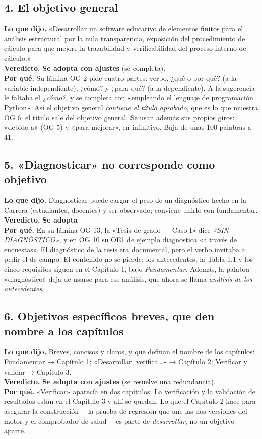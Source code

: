 \documentclass[11pt,a4paper]{article}
\newcommand{\adopta}{\textcolor{adopta}{\textbf{Se adopta}}}
\newcommand{\adapta}{\textcolor{adapta}{\textbf{Se adopta con ajustes}}}
\begin{document}
\subsection*{4. El objetivo general}
\textbf{Lo que dijo.} «Desarrollar un software educativo de elementos finitos para el análisis estructural por la nula transparencia, exposición del procedimiento de cálculo para que mejore la trazabilidad y verificabilidad del proceso interno de cálculo.»\\
\textbf{Veredicto.} \adapta{} (se completa).\\
\textbf{Por qué.} Su lámina OG 2 pide cuatro partes: verbo, ¿qué o por qué? (a la variable independiente), ¿cómo? y ¿para qué? (a la dependiente). A la sugerencia le faltaba el \emph{¿cómo?}, y se completa con «empleando el lenguaje de programación Python». Así el objetivo general \emph{contiene el título aprobado}, que es lo que muestra OG 6: el título sale del objetivo general. Se usan además sus propios giros: «debido a» (OG 5) y «para mejorar», en infinitivo. Baja de unas 100 palabras a 41.

\subsection*{5. «Diagnosticar» no corresponde como objetivo}
\textbf{Lo que dijo.} Diagnosticar puede cargar el peso de un diagnóstico hecho en la Carrera (estudiantes, docentes) y ser observado; conviene unirlo con fundamentar.\\
\textbf{Veredicto.} \adopta{}\\
\textbf{Por qué.} En su lámina OG 13, la «Tesis de grado --- Caso I» dice \emph{«SIN DIAGNÓSTICO»}, y en OG 10 su OE1 de ejemplo diagnostica «a través de encuestas». El diagnóstico de la tesis era documental, pero el verbo invitaba a pedir el de campo. El contenido no se pierde: los antecedentes, la Tabla 1.1 y los cinco requisitos siguen en el Capítulo 1, bajo \emph{Fundamentar}. Además, la palabra «diagnóstico» deja de usarse para ese análisis, que ahora se llama \emph{análisis de los antecedentes}.

\subsection*{6. Objetivos específicos breves, que den nombre a los capítulos}
\textbf{Lo que dijo.} Breves, concisos y claros, y que definan el nombre de los capítulos: Fundamentar → Capítulo 1; «Desarrollar, verifica\ldots» → Capítulo 2; Verificar y validar → Capítulo 3.\\
\textbf{Veredicto.} \adapta{} (se resuelve una redundancia).\\
\textbf{Por qué.} «Verificar» aparecía en dos capítulos. La verificación y la validación de resultados están en el Capítulo 3 y ahí se quedan. Lo que el Capítulo 2 hace para asegurar la construcción ---la prueba de regresión que une las dos versiones del motor y el comprobador de salud--- es parte de \emph{desarrollar}, no un objetivo aparte.
\end{document}
